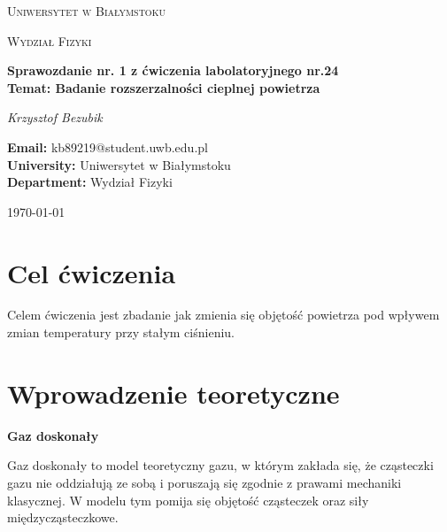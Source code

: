 \documentclass{article}
\begin{document}
\begin{titlepage}
    \centering
    \vspace*{1cm}
    
    {\scshape\LARGE Uniwersytet w Białymstoku \par}
    \vspace{1.5cm}
    
    {\scshape\Large Wydział Fizyki \par}
    \vspace{1.5cm}
    
    {\huge\bfseries Sprawozdanie nr. 1 z ćwiczenia labolatoryjnego nr.24\\
    Temat: Badanie rozszerzalności cieplnej powietrza \\ \par}
    \vspace{2cm}
    
    {\Large\itshape Krzysztof Bezubik \par}
    \vspace{1cm}
    
    \begin{flushleft} 
    \large
    \textbf{Email:} kb89219@student.uwb.edu.pl \\
    \textbf{University:} Uniwersytet w Białymstoku \\
    \textbf{Department:} Wydział Fizyki \\
    \end{flushleft}
    
    \vfill
    
    {\large \today\par}
\end{titlepage}

\section{Cel ćwiczenia}
Celem ćwiczenia jest zbadanie jak zmienia się objętość powietrza pod wpływem zmian temperatury przy stałym ciśnieniu. 

\section{Wprowadzenie teoretyczne}

\textbf{Gaz doskonały} 

Gaz doskonały to model teoretyczny gazu, w którym zakłada się, że cząsteczki gazu nie oddziałują ze sobą i poruszają się zgodnie z prawami mechaniki klasycznej. W modelu tym pomija się objętość cząsteczek oraz siły międzycząsteczkowe.
\end{document}
